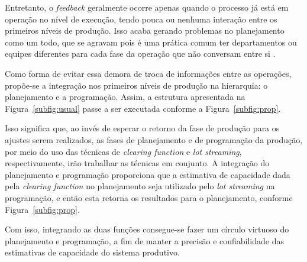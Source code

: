     
    Entretanto, o \textit{feedback} geralmente ocorre apenas quando o processo já está em operação no nível de execução, tendo pouca ou nenhuma interação entre os primeiros níveis de produção. Isso acaba gerando problemas no planejamento como um todo, que se agravam pois é uma prática comum ter departamentos ou equipes diferentes para cada fase da operação que não conversam entre si \cite{Hopp2001}.
    
    Como forma de evitar essa demora de troca de informações entre as operações, propõe-se a integração nos primeiros níveis de produção na hierarquia: o planejamento e a programação. Assim, a estrutura apresentada na Figura~\ref{subfig:usual} passe a ser executada conforme a Figura~\ref{subfig:prop}.
    
    
    
    
    Isso significa que, ao invés de esperar o retorno da fase de produção para os ajustes serem realizados, as fases de planejamento e de programação da produção, por meio do uso das técnicas de \textit{clearing function} e \textit{lot streaming}, respectivamente, irão trabalhar as técnicas em conjunto. A integração do planejamento e programação proporciona que a estimativa de capacidade dada pela \textit{clearing function} no planejamento seja utilizado pelo \textit{lot streaming} na programação, e então esta retorna os resultados para o planejamento, conforme Figura~\ref{subfig:prop}.
    
    Com isso, integrando as duas funções consegue-se fazer um círculo virtuoso do planejamento e programação, a fim de manter a precisão e confiabilidade das estimativas de capacidade do sistema produtivo.
    
    